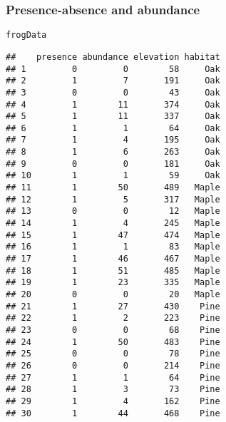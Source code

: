 \documentclass[color=usenames,dvipsnames]{beamer}\usepackage[]{graphicx}\usepackage[]{color}
\makeatletter
\newcommand{\hlstd}[1]{\textcolor[rgb]{0,0,0}{#1}}%
\newenvironment{kframe}{%
 \def\at@end@of@kframe{}%
 \ifinner\ifhmode%
  \def\at@end@of@kframe{\end{minipage}}%
  \begin{minipage}{\columnwidth}%
 \fi\fi%
 \def\FrameCommand##1{\hskip\@totalleftmargin \hskip-\fboxsep
 \colorbox{shadecolor}{##1}\hskip-\fboxsep
     \hskip-\linewidth \hskip-\@totalleftmargin \hskip\columnwidth}%
 \MakeFramed {\advance\hsize-\width
   \@totalleftmargin\z@ \linewidth\hsize
   \@setminipage}}%
 {\par\unskip\endMakeFramed%
 \at@end@of@kframe}
\newenvironment{knitrout}{}{} %
\makeatother
\begin{document}
\begin{frame}[fragile]
  \frametitle{Presence-absence and abundance}

\begin{center}
\tiny
\begin{knitrout}\tiny
{}\color{fgcolor}\begin{kframe}
\begin{alltt}
\hlstd{frogData}
\end{alltt}
\begin{verbatim}
##    presence abundance elevation habitat
## 1         0         0        58     Oak
## 2         1         7       191     Oak
## 3         0         0        43     Oak
## 4         1        11       374     Oak
## 5         1        11       337     Oak
## 6         1         1        64     Oak
## 7         1         4       195     Oak
## 8         1         6       263     Oak
## 9         0         0       181     Oak
## 10        1         1        59     Oak
## 11        1        50       489   Maple
## 12        1         5       317   Maple
## 13        0         0        12   Maple
## 14        1         4       245   Maple
## 15        1        47       474   Maple
## 16        1         1        83   Maple
## 17        1        46       467   Maple
## 18        1        51       485   Maple
## 19        1        23       335   Maple
## 20        0         0        20   Maple
## 21        1        27       430    Pine
## 22        1         2       223    Pine
## 23        0         0        68    Pine
## 24        1        50       483    Pine
## 25        0         0        78    Pine
## 26        0         0       214    Pine
## 27        1         1        64    Pine
## 28        1         3        73    Pine
## 29        1         4       162    Pine
## 30        1        44       468    Pine
\end{verbatim}
\end{kframe}
\end{knitrout}
\end{center}
\end{frame}



\end{document}
